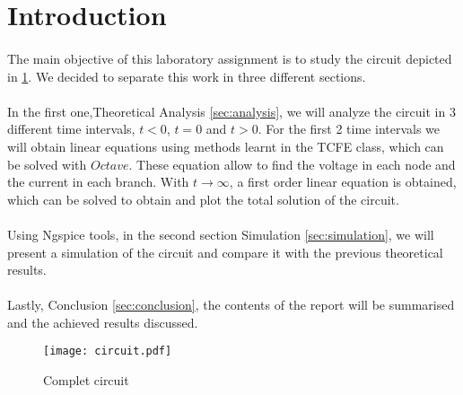 \newpage
\section{Introduction}
\label{sec:introduction}

\paragraph{} The main objective of this laboratory assignment is to study the circuit depicted in \ref{fig:circuit}. We decided to
separate this work in three different sections. \paragraph{}
In the first one,Theoretical Analysis \ref{sec:analysis}, we will analyze the circuit in 3 different
time intervals, $t<0$, $t=0$ and $t>0$. For the first 2 time intervals we will obtain linear equations using methods learnt in the TCFE class,
which can be solved with $Octave$. These equation allow to find the voltage in each node and the current
in each branch. With $t \rightarrow \infty $, a first order linear equation is obtained, which can be solved to obtain and plot the total solution of
the circuit. \paragraph{}
Using Ngspice tools, in the second section Simulation \ref{sec:simulation}, we will present a simulation of the circuit
and compare it with the previous theoretical results. \paragraph{}
Lastly, Conclusion \ref{sec:conclusion}, the contents of the report will be summarised and the achieved results discussed.

\begin{figure}[h]
    \centering
    \texttt{[image: circuit.pdf]}
    \caption{Complet circuit}
    \label{fig:circuit}
\end{figure}

